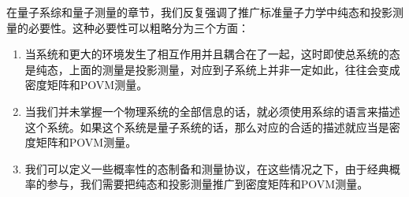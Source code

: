 

在量子系综和量子测量的章节，我们反复强调了推广标准量子力学中纯态和投影测量的必要性。这种必要性可以粗略分为三个方面：
\begin{enumerate}
\item 当系统和更大的环境发生了相互作用并且耦合在了一起，这时即使总系统的态是纯态，上面的测量是投影测量，对应到子系统上并非一定如此，往往会变成密度矩阵和POVM测量。
\item 当我们并未掌握一个物理系统的全部信息的话，就必须使用系综的语言来描述这个系统。如果这个系统是量子系统的话，那么对应的合适的描述就应当是密度矩阵和POVM测量。
\item 我们可以定义一些概率性的态制备和测量协议，在这些情况之下，由于经典概率的参与，我们需要把纯态和投影测量推广到密度矩阵和POVM测量。
\end{enumerate}

